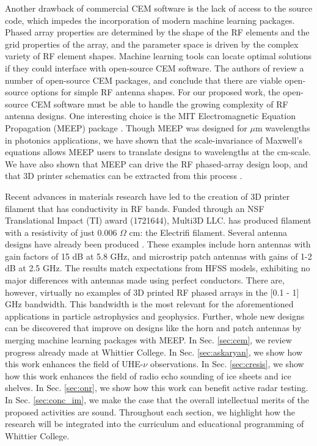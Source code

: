 \documentclass[../../main.tex]{subfiles}
\begin{document}
Another drawback of commercial CEM software is the lack of access to the source code, which impedes the incorporation of modern machine learning packages.  Phased array properties are determined by the shape of the RF elements and the grid properties of the array, and the parameter space is driven by the complex variety of RF element shapes.  Machine learning tools can locate optimal solutions if they could interface with open-source CEM software.  The authors of \cite{10.3390/electronics8121506} review a number of open-source CEM packages, and conclude that there are viable open-source options for simple RF antenna shapes.  For our proposed work, the open-source CEM software must be able to handle the growing complexity of RF antenna designs.  One interesting choice is the MIT Electromagnetic Equation Propagation (MEEP) package \cite{10.1016/j.cpc.2009.11.008}.  Though MEEP was designed for $\mu$m wavelengths in photonics applications, we have shown that the scale-invariance of Maxwell's equations allows MEEP users to translate designs to wavelengths at the cm-scale.  We have also shown that MEEP can drive the RF phased-array design loop, and that 3D printer schematics can be extracted from this process \cite{electronics10040415,meepcon2022,10.1016/j.cpc.2009.11.008}. \\ \vspace{2.5mm}

Recent advances in materials research have led to the creation of 3D printer filament that has conductivity in RF bands.  Funded through an NSF Translational Impact (TI) award (1721644), Multi3D LLC. has produced filament with a resistivity of just 0.006 $\Omega$ cm: the Electrifi filament.  Several antenna designs have already been produced \cite{8786183,10.1049/iet-map.2017.0104}.  These examples include horn antennas with gain factors of 15 dB at 5.8 GHz, and microstrip patch antennas with gains of 1-2 dB at 2.5 GHz.  The results match expectations from HFSS models, exhibiting no major differences with antennas made using perfect conductors.  There are, however, virtually no examples of 3D printed RF phased arrays in the [0.1 - 1] GHz bandwidth.  This bandwidth is the most relevant for the aforementioned applications in particle astrophysics and geophysics.  Further, whole new designs can be discovered that improve on designs like the horn and patch antennas by merging machine learning packages with MEEP.  In Sec. \ref{sec:cem}, we review progress already made at Whittier College.  In Sec. \ref{sec:askaryan}, we show how this work enhances the field of UHE-$\nu$ observations.  In Sec. \ref{sec:cresis}, we show how this work enhances the field of radio echo sounding of ice sheets and ice shelves.  In Sec. \ref{sec:onr}, we show how this work can benefit active radar testing.  In Sec. \ref{sec:conc_im}, we make the case that the overall intellectual merits of the proposed activities are sound.  Throughout each section, we highlight how the research will be integrated into the curriculum and educational programming of Whittier College.
\end{document}
